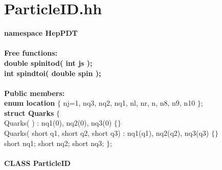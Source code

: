 \section {ParticleID.hh}
\label{PID}

\begin{tabbing}

{\bf namespace HepPDT} \\  \\

{\bf Free functions:} \\
\hspace{0.5in}  {\bf double spinitod( int js ); } \\
\hspace{0.5in}  {\bf int spindtoi( double spin ); } \\  \\

{\bf Public members:} \\
\hspace{0.5in}  {\bf enum location } 
       $\{$ nj=1, nq3, nq2, nq1, nl, nr, n, n8, n9, n10 $\}$; \\
\hspace{0.5in}  {\bf  struct Quarks } $\{$ \\
\hspace{1.0in}    Quarks( ) : nq1(0), nq2(0), nq3(0)  $\{\}$ \\
\hspace{1.0in}    Quarks( short q1, short q2, short q3) : nq1(q1), nq2(q2), nq3(q3) $\{\}$ \\
\hspace{1.0in}    short nq1;
    short nq2;
    short nq3; $\}$; \\  \\

{\bf CLASS ParticleID } \\  \\


\end{tabbing}
